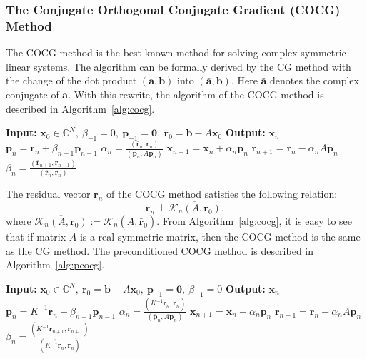 \subsubsection{{The Conjugate Orthogonal Conjugate Gradient (COCG) Method}}\label{subsec:cocg-method}
{The COCG method  is the best-known method for solving complex symmetric linear systems. The algorithm can be formally derived by the CG method with the change of the dot product $(\bm a,\bm b)$ into $(\bar{\bm a},\bm b)$. Here $\bar{\bm a}$ denotes the complex conjugate of $\bm a$. With this rewrite, the algorithm of the COCG method is described in Algorithm\ \ref{alg:cocg}.}
\begin{algorithm}[H]\caption{{The COCG method (note: $(\bar{\bm a},\bm b)=\bm a^{\top}\bm b$)}}\label{alg:cocg}\begin{algorithmic}[1]
\Statex\textbf{Input:} $\bm x_0\in\mathbb C^N,\ \beta_{-1}=0,\ \bm p_{-1}=\bm0,\ \bm r_0=\bm b-A\bm x_0$
\Statex\textbf{Output:} $\bm x_n$
\State $\bm p_n=\bm r_n+\beta_{n-1}\bm p_{n-1}$
\State $\alpha_n=\frac{(\bar{\bm r}_n,\bm r_n)}{(\bar{\bm p}_n,A\bm p_n)}$
\State $\bm x_{n+1}=\bm x_n+\alpha_n\bm p_n$
\State $\bm r_{n+1}=\bm r_n-\alpha_nA\bm p_n$
\State $\beta_n=\frac{(\bar{\bm r}_{n+1},\bm r_{n+1})}{(\bar{\bm r}_n,\bm r_n)}$
\EndFor\end{algorithmic}\end{algorithm}
{The residual vector $\bm r_n$ of the COCG method satisfies the following relation:}
\[\bm r_n\perp\overline{\mathcal K_n(A,\bm r_0)},\]
{where $\overline{\mathcal K_n(A,\bm r_0)}:=\mathcal K_n(\bar A,\bar{\bm r}_0)$. From Algorithm\ \ref{alg:cocg}, it is easy to see that if matrix $A$ is a real symmetric matrix, then the COCG method is the same as the CG method. The preconditioned COCG method is described in Algorithm\ \ref{alg:pcocg}.}
\begin{algorithm}[H]\caption{{The preconditioned COCG method (note: $(\bar{\bm a},\bm b)=\bm a^{\top}\bm b$)}}\label{alg:pcocg}\begin{algorithmic}[1]
\Statex\textbf{Input:} $\bm x_0\in\mathbb C^N,\ \bm r_0=\bm b-A\bm x_0,\ \bm p_{-1}=\bm0,\ \beta_{-1}=0$
\Statex\textbf{Output:} $\bm x_n$
\State $\bm p_n=K^{-1}\bm r_n+\beta_{n-1}\bm p_{n-1}$
\State $\alpha_n=\frac{(\overline{K^{-1}\bm r_n},\bm r_n)}{(\bar{\bm p}_n,A\bm p_n)}$
\State $\bm x_{n+1}=\bm x_n+\alpha_n\bm p_n$
\State $\bm r_{n+1}=\bm r_n-\alpha_nA\bm p_n$
\State $\beta_n=\frac{(\overline{K^{-1}\bm r_{n+1}},\bm r_{n+1})}{(\overline{K^{-1}\bm r_n},\bm r_n)}$
\EndFor\end{algorithmic}\end{algorithm}
